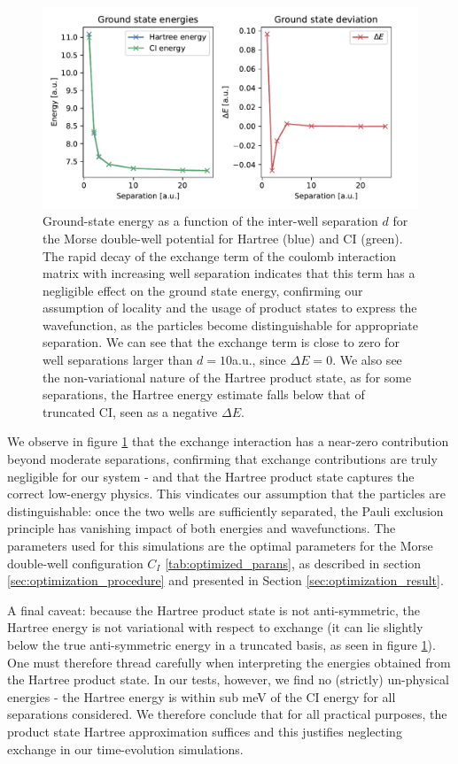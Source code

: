 \documentclass{subfiles}
\begin{document}
\begin{figure}[h!]
    \centering
    \includegraphics[width=1.0\textwidth]{figs/exchange_shift.pdf}
    \caption{Ground-state energy as a function of the inter-well separation $d$ for the Morse double-well potential for Hartree (blue) and CI (green). The rapid decay of the exchange term of the coulomb interaction matrix with increasing well separation indicates that this term has a negligible effect on the ground state energy, confirming our assumption of locality and the usage of product states to express the wavefunction, as the particles become distinguishable for appropriate separation. We can see that the exchange term is close to zero for well separations larger than $d = 10$a.u., since $\Delta E=0$. We also see the non-variational nature of the Hartree product state, as for some separations, the Hartree energy estimate falls below that of truncated CI, seen as a negative $\Delta E$.}
    \label{fig:exchange_shift}
\end{figure}
We observe in figure \ref{fig:exchange_shift} that the exchange interaction has a near-zero contribution beyond moderate separations, confirming that exchange contributions are truly negligible for our system - and that the Hartree product state captures the correct low-energy physics. This vindicates our assumption that the particles are distinguishable: once the two wells are sufficiently separated, the Pauli exclusion principle has vanishing impact of both energies and wavefunctions. The parameters used for this simulations are the optimal parameters for the Morse double-well configuration $C_I$ \ref{tab:optimized_parans}, as described in section \ref{sec:optimization_procedure} and presented in Section \ref{sec:optimization_result}. 

A final caveat: because the Hartree product state is not anti-symmetric, the Hartree energy is not variational with respect to exchange (it can lie slightly below the true anti-symmetric energy in a truncated basis, as seen in figure \ref{fig:exchange_shift}). One must therefore thread carefully when interpreting the energies obtained from the Hartree product state. In our tests, however, we find no (strictly) un-physical energies - the Hartree energy is within sub meV of the CI energy for all separations considered. We therefore conclude that for all practical purposes, the product state Hartree approximation suffices and this justifies neglecting exchange in our time-evolution simulations.
\end{document}
